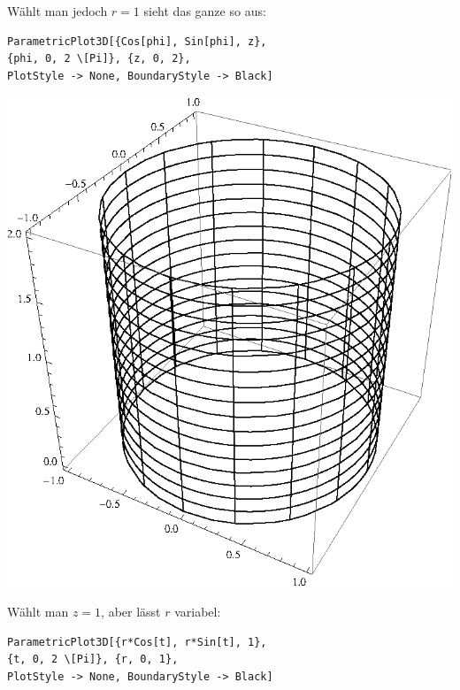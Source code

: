 \documentclass[10pt,a4paper]{scrartcl}
\begin{document}
\begin{enumerate}[(i)]
\begin{minipage}{0.50\columnwidth}
\begin{center}
\end{center}
\end{minipage}
\begin{minipage}{0.49\columnwidth}
Wählt man jedoch $r=1$ sieht das ganze so aus:
\begin{lstlisting}[caption= Mathematica Code für den Graph von Z]
ParametricPlot3D[{Cos[phi], Sin[phi], z}, 
{phi, 0, 2 \[Pi]}, {z, 0, 2}, 
PlotStyle -> None, BoundaryStyle -> Black]
\end{lstlisting}
\end{minipage}
\begin{minipage}{0.50\columnwidth}
\begin{center}
\includegraphics[scale=0.7]{1iv.eps} 
\end{center}
\end{minipage}
\begin{minipage}{0.50\columnwidth}
Wählt man $z = 1$, aber lässt $r$ variabel:
\begin{lstlisting}[caption= Mathematica Code für den Graph von Z]
ParametricPlot3D[{r*Cos[t], r*Sin[t], 1}, 
{t, 0, 2 \[Pi]}, {r, 0, 1}, 
PlotStyle -> None, BoundaryStyle -> Black]
\end{lstlisting}
\end{minipage}

\end{enumerate}
\end{document}
